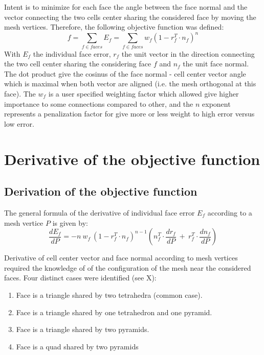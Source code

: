 \documentclass[11pt]{article}
\begin{document}
Intent is to minimize for each face the angle between the face normal and the vector connecting the two cells center sharing the considered face by moving the mesh vertices. Therefore, the following objective function was defined:
\begin{equation}
f = \sum_{f \in faces} E_f = \sum_{f \in faces} w_f \left( 1 - r_f^T \cdot n_f \right) ^n
\label{objective_function}
\end{equation}
With $E_f$ the individual face error, $r_f$ the unit vector in the direction connecting the two cell center sharing the considering face $f$ and $n_f$ the unit face normal. 
The dot product give the cosinus of the face normal - cell center vector angle which is maximal when both vector are aligned (i.e. the mesh orthogonal at this face). 
The $w_f$ is a user specified weighting factor which allowed give higher importance to some connections compared to other, and the $n$ exponent represents a penalization factor for give more or less weight to high error versus low error. 

\section{Derivative of the objective function}

\subsection{Derivation of the objective function}

The general formula of the derivative of individual face error $E_f$ according to a mesh vertice $P$ is given by:
\begin{equation}
\frac{dE_f}{dP} = - n\ w_f\ \left( 1 - r_f^T \cdot n_f \right)^{n-1} \left(n_f^T \cdot \frac{d r_f}{dP}\ +\ r_f^T \cdot \frac{d n_f}{dP}\right)
\label{general_derivative_expression}
\end{equation}

Derivative of cell center vector and face normal according to mesh vertices required the knowledge of of the configuration of the mesh near the considered faces. Four distinct cases were identified (see X):
\begin{enumerate}
  \item Face is a triangle shared by two tetrahedra (common case). 
  \item Face is a triangle shared by one tetrahedron and one pyramid.
  \item Face is a triangle shared by two pyramids.
  \item Face is a quad shared by two pyramids
\end{enumerate}
\end{document}
